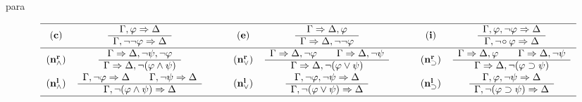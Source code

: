 \begin{entry}{para}  

\newcommand{\G}{{\bf G}}
\newcommand{\GBK}{{\G_{\bf BK}}}
\newcommand{\name}[1]{{\bf (#1)}}
\newcommand{\vfi}{\varphi}
\newcommand{\su}{\supset}
\newcommand{\ssrul}[2]{\begin{array}{c}#1\\ \hline #2\end{array}}
\newcommand{\ddrul}[3]{\begin{array}{c}#1\hspace{2em}#2\\
\hline #3\end{array}}
\newcommand{\Ga}{\Gamma}
\newcommand{\De}{\Delta}
\newcommand{\Ra}{\Rightarrow}
\newcommand{\srul}[4]{\ssrul{\Ga #1\Ra\De #2}{\Ga
#3\Ra\De #4}}
\newcommand{\drul}[6]{\ddrul{\Ga #1\Ra\De #2}{\Ga #3\Ra\De #4}{\Ga
#5\Ra\De #6}}
\newcommand{\w}{\wedge}

\begin{calculus}

\renewcommand*{\arraystretch}{1.5}
\footnotesize
\[\begin{tabular}{ccc@{\hspace{2em}}ccc@{\hspace{2em}}cc}\hline

${\name{c}}$ &     $\srul{,\vfi}{}{,\neg\neg\vfi}{}$  &&         
${\name{e}}$    & $\srul{}{,\vfi}{}{,\neg\neg\vfi}$  &&
${\name{i}}$ &    $\srul{,\vfi,\neg\vfi}{}{,\neg\! \circ \vfi}{}$ \\\hline
${\name{n^r_\w}}$ &  
$\srul{}{,\neg\psi,\neg\vfi}{}{,\neg (\vfi\w\psi)}$ &&
${\name{n^r_\vee}}$ &       $\drul{}{,\neg\vfi}{}{,\neg\psi}{}{,\neg(\vfi\vee\psi)}$
&&
${\name{n^r_\su}}$ &   $\drul{}{,\vfi}{}{,\neg\psi}{}{,\neg(\vfi\su\psi)}$ 
 \\

${\name{n^l_\w}}$ &   $\drul{,\neg \vfi}{}{,\neg \psi}{}{,\neg(\vfi\w\psi)}{}$ &&
${\name{n^l_\vee}}$ & $\srul{,\neg\vfi,\neg\psi}{}{,\neg(\vfi\vee\psi)}{}$ && 
${\name{n^l_\su}}$  &  $\srul{,\vfi,\neg\psi}{}{,\neg(\vfi\su \psi)}{}$  \\\hline


\end{tabular}\]
\end{calculus}
\end{entry}
